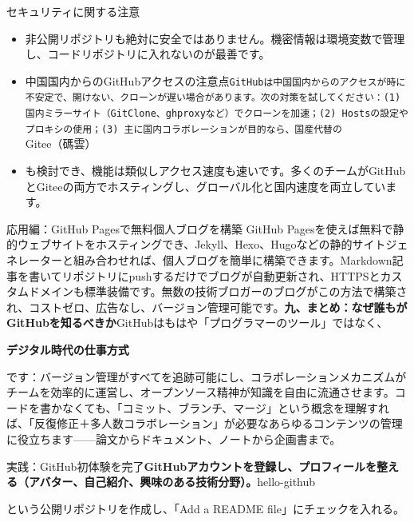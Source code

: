 \begin{tcbwarn}{セキュリティに関する注意}
\begin{itemize}
  \item 非公開リポジトリも絶対に安全ではありません。機密情報は環境変数で管理し、コードリポジトリに入れないのが最善です。
  \item 中国国内からのGitHubアクセスの注意点\texttt{GitHubは中国国内からのアクセスが時に不安定で、開けない、クローンが遅い場合があります。次の対策を試してください：(1) 国内ミラーサイト（GitClone、ghproxyなど）でクローンを加速；(2) Hostsの設定やプロキシの使用；(3) 主に国内コラボレーションが目的なら、国産代替の}Gitee（碼雲）
  \item も検討でき、機能は類似しアクセス速度も速いです。多くのチームがGitHubとGiteeの両方でホスティングし、グローバル化と国内速度を両立しています。
\end{itemize}

\end{tcbwarn}

\begin{tcbinfo}{応用編：GitHub Pagesで無料個人ブログを構築}
GitHub Pagesを使えば無料で静的ウェブサイトをホスティングでき、Jekyll、Hexo、Hugoなどの静的サイトジェネレーターと組み合わせれば、個人ブログを簡単に構築できます。Markdown記事を書いてリポジトリにpushするだけでブログが自動更新され、HTTPSとカスタムドメインも標準装備です。無数の技術ブロガーのブログがこの方法で構築され、コストゼロ、広告なし、バージョン管理可能です。\textbf{九、まとめ：なぜ誰もがGitHubを知るべきか}GitHubはもはや「プログラマーのツール」ではなく、

\end{tcbinfo}

\textbf{デジタル時代の仕事方式}\par

です：バージョン管理がすべてを追跡可能にし、コラボレーションメカニズムがチームを効率的に運営し、オープンソース精神が知識を自由に流通させます。コードを書かなくても、「コミット、ブランチ、マージ」という概念を理解すれば、「反復修正＋多人数コラボレーション」が必要なあらゆるコンテンツの管理に役立ちます——論文からドキュメント、ノートから企画書まで。


実践：GitHub初体験を完了\textbf{GitHubアカウントを登録し、プロフィールを整える（アバター、自己紹介、興味のある技術分野）。}hello-github

という公開リポジトリを作成し、「Add a README file」にチェックを入れる。

